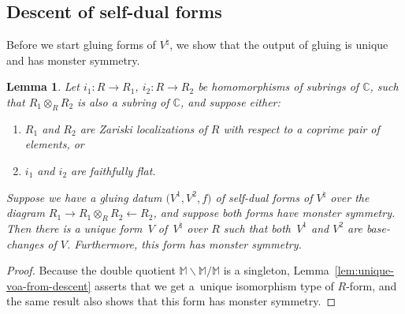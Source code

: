 \documentclass[11pt]{article}
\newcommand{\bC}{\mathbb{C}}
\newcommand{\bM}{\mathbb{M}}
\newtheorem{lem}[thm]{Lemma}
\theoremstyle{definition}
\begin{document}
\subsection{Descent of self-dual forms}

Before we start gluing forms of $V^\natural$, we show that the output of gluing is unique and has monster symmetry.

\begin{lem} \label{lem:unique-R-forms-of-moonshine-from-gluing-data}Let $i_1\colon R \to R_1$, $i_2\colon R \to R_2$ be homomorphisms of subrings of $\bC$, such that $R_1 \otimes_{R} R_2$ is also a subring of $\bC$, and suppose either:
\begin{enumerate}\itemsep=0pt
\item[$1)$] $R_1$ and $R_2$ are Zariski localizations of $R$ with respect to a coprime pair of elements, or
\item[$2)$] $i_1$ and $i_2$ are faithfully flat.
\end{enumerate}
Suppose we have a gluing datum $\big(V^1, V^2, f\big)$ of self-dual forms of $V^\natural$ over the diagram $R_1 \to R_1 \otimes_{R} R_2 \leftarrow R_2$, and suppose both forms have monster symmetry. Then there is a unique form~$V$ of~$V^\natural$ over $R$ such that both~$V^1$ and $V^2$ are base-changes of $V$. Furthermore, this form has monster symmetry.
\end{lem}
\begin{proof}Because the double quotient $\bM \backslash \bM / \bM$ is a singleton, Lemma~\ref{lem:unique-voa-from-descent} asserts that we get a~unique isomorphism type of $R$-form, and the same result also shows that this form has monster symmetry.
\end{proof}
\end{document}
